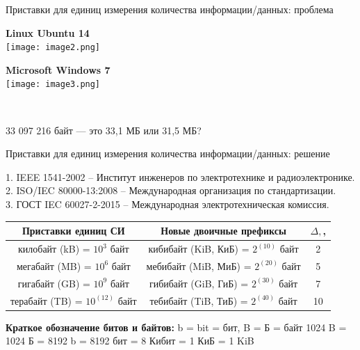 \documentclass{beamer}
\begin{document}
\begin{frame}
    \begin{flushright}
        Приставки для единиц измерения
количества информации/данных: проблема
    \end{flushright}
    \begin{minipage}{0.45\textwidth}
        \centering
        \textbf{Linux Ubuntu 14} \\
        \vspace{0.5em}
        \texttt{[image: image2.png]}
    \end{minipage}%
    \hfill
    \begin{minipage}{0.45\textwidth}
        \centering
        \textbf{Microsoft Windows 7} \\
        \vspace{0.5em}
        \texttt{[image: image3.png]}
    \end{minipage} \\
    \begin{center}
        33 097 216 байт — это 33,1 МБ или 31,5 МБ?
    \end{center}
\end{frame}
\begin{frame}
    \begin{flushright}
        Приставки для единиц измерения
количества информации/данных: решение
    \end{flushright}
    1. IEEE 1541-2002 – Институт инженеров по электротехнике и радиоэлектронике. \\
    2. ISO/IEC 80000-13:2008 – Международная организация по стандартизации. \\
    3. ГОСТ IEC 60027-2-2015 – Международная электротехническая комиссия. \\
    \begin{table}
    \centering
    \begin{tabular}{|c|c|c|}
        \hline
        Приставки единиц СИ & Новые двоичные префиксы & $\Delta,  $,  \\ \hline
        килобайт (kB) = $10^3$ байт        & кибибайт (KiB, КиБ) = $2^(10)$ байт         & 2         \\ \hline
        мегабайт (MB) = $10^6$ байт        & мебибайт (MiB, МиБ) = $2^(20)$ байт         & 5         \\ \hline
        гигабайт (GB) = $10^9$ байт        & гибибайт (GiB, ГиБ) = $2^(30)$ байт         & 7         \\ \hline
        терабайт (TB) = $10^(12)$ байт       & тебибайт (TiB, ТиБ) = $2^(40)$ байт         & 10         \\ \hline
    \end{tabular}
\end{table}
\textbf{Краткое обозначение битов и байтов: }  b = bit = бит, B = Б = байт
 1024 B = 1024 Б = 8192 b = 8192 бит = 8 Кибит = 1 КиБ = 1 KiB
\end{frame}
\end{document}
